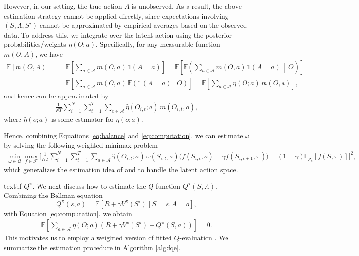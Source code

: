 \documentclass[12pt]{article}
\newcommand{\0}{\boldsymbol{0}}
\newcommand{\E}{\mathbb{E}}
\begin{document}
However, in our setting, the true action $A$ is unobserved. As a result, the above estimation strategy cannot be applied directly, since expectations involving $(S, A, S')$ cannot be approximated by empirical averages based on the observed data. To address this, we integrate
over the latent action using the posterior probabilities/weights
$\eta(O;a)$. Specifically, for any measurable function
$m(O,A)$, we have 
\begin{align*}
\E\!\left[m(O,A)\right]
&= \E\!\left[ \sum_{a \in \mathcal{A}} m(O,a)\,\mathds{1}(A=a) \right] = \E\!\left[ \E\!\left( \sum_{a \in \mathcal{A}} m(O,a)\,\mathds{1}(A=a) \,\middle|\, O \right) \right] \\
&= \E\!\left[ \sum_{a \in \mathcal{A}} m(O,a)\, \E\!\left(\mathds{1}(A=a) \mid O \right) \right] = \E\!\left[ \sum_{a \in \mathcal{A}} \eta(O;a)\, m(O,a) \right],
\end{align*}
and hence can be approximated by \begin{gather} \label{eq:computation}
    \frac{1}{NT}\sum_{i=1}^N\sum_{t=1}^T\sum_{a\in\mathcal A}
\widehat \eta(O_{i,t};a)\,m(O_{i,t},a),
\end{gather} where $\widehat \eta(o ;a)$ is some estimator for $\eta(o;a)$.

Hence, combining Equations \eqref{eq:balance} and \eqref{eq:computation}, we can
estimate $\omega$ by solving the following weighted minimax problem
\begin{align}
\min_{\omega \in \Omega} \max_{f \in \mathcal{F}}
\Bigg[
\frac{1}{NT}\sum_{i=1}^N\sum_{t=1}^T\sum_{a\in\mathcal A}\widehat \eta(O_{i,t};a)\,
\omega(S_{i,t},a)
\Big(
f(S_{i,t},a)
-
\gamma f(S_{i,t+1},\pi)
\Big)
-(1-\gamma)\E_{p_e}[f(S,\pi)]
\Bigg]^2,
\label{eq:latent_dice_combined}
\end{align}
\noindent which generalizes the estimation idea of \citet{liu2018breaking} and \citet{uehara2020minimax} to handle the latent action space.

\csname textbf $Q^\pi$.
We next discuss how to estimate the $Q$-function $Q^\pi(S,A)$. Combining the Bellman equation
\begin{equation}
Q^\pi(s,a) = \mathbb E\!\left[ R + \gamma V^\pi(S') \mid S=s, A=a \right],
\label{eq:bellman_Q}
\end{equation} with Equation \eqref{eq:computation}, we obtain \begin{gather*}
    \E\!\left[\sum_{a\in\mathcal A}
\eta(O;a)\left(R+\gamma V^\pi(S')-Q^\pi(S,a) \right)\right]=0.
\end{gather*} This motivates us to employ a weighted version of fitted $Q$-evaluation \citep[FQE,][]{ernst2005tree}.
 We summarize the estimation procedure in Algorithm \ref{alg:fqe}. 
\end{document}

